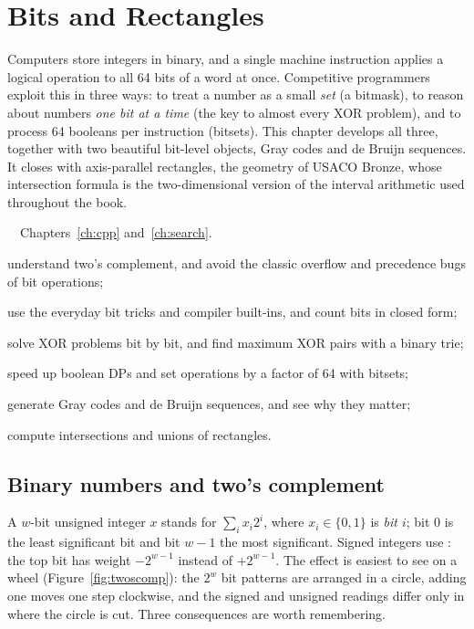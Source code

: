 \chapter{Bits and Rectangles}\label{ch:bits}

Computers store integers in binary, and a single machine instruction applies a logical operation to all 64 bits of a word at
once. Competitive programmers exploit this in three ways: to treat a number as a small \emph{set} (a bitmask), to reason
about numbers \emph{one bit at a time} (the key to almost every XOR problem), and to process 64 booleans per instruction
(bitsets). This chapter develops all three, together with two beautiful bit-level objects, Gray codes and de Bruijn
sequences. It closes with axis-parallel rectangles, the geometry of USACO Bronze, whose intersection formula is the
two-dimensional version of the interval arithmetic used throughout the book.

\begin{chapterintro}{\bronze\ \silver\ \gold}{Chapters~\ref{ch:cpp} and~\ref{ch:search}.}
  \item understand two's complement, and avoid the classic overflow and precedence bugs of bit operations;
  \item use the everyday bit tricks and compiler built-ins, and count bits in closed form;
  \item solve XOR problems bit by bit, and find maximum XOR pairs with a binary trie;
  \item speed up boolean DPs and set operations by a factor of 64 with bitsets;
  \item generate Gray codes and de Bruijn sequences, and see why they matter;
  \item compute intersections and unions of rectangles.
\end{chapterintro}

\section[Binary numbers and two's complement]{Binary numbers and two's complement \hfill \bronze}\label{sec:binary}

A $w$-bit unsigned integer $x$ stands for $\sum_{i} x_i 2^i$, where $x_i \in \{0, 1\}$ is \emph{bit $i$}; bit 0 is the least
significant bit and bit $w - 1$ the most significant. Signed integers use : the top bit has weight
$-2^{w-1}$ instead of $+2^{w-1}$. The effect is easiest to see on a wheel (Figure~\ref{fig:twoscomp}): the $2^w$ bit patterns
are arranged in a circle, adding one moves one step clockwise, and the signed and unsigned readings differ only in where the
circle is cut. Three consequences are worth remembering.

